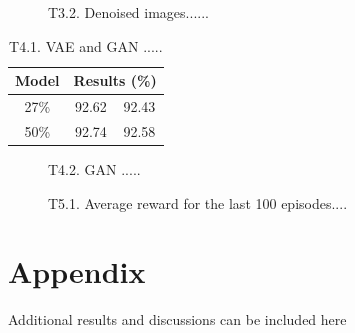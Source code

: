 \documentclass[10pt,twocolumn,letterpaper]{article}
\begin{document}
\begin{figure}[h]
\begin{center}
\fbox{\rule{0pt}{1.2in} \rule{0.99\linewidth}{0pt}}
\end{center}
   \caption{T3.2. Denoised images......}
\label{fig:8}
\end{figure} 

\begin{table}[h]
\small
    \centering
    \begin{tabular}{c|c|c}
        Model & \multicolumn{2}{c}{ Results (\%)} \\
        \hline
        27\% & 92.62 & 92.43 \\ %
        50\% & 92.74 & 92.58 \\ %
    \end{tabular}%
    \medbreak
    \caption{T4.1. VAE and GAN ..... }
    \label{table:3}
\end{table}



\begin{figure}[t]
\begin{center}
\fbox{\rule{0pt}{1.2in} \rule{0.99\linewidth}{0pt}}
\end{center}
   \caption{T4.2. GAN .....}
\label{fig:9}
\end{figure}




\begin{figure}[h]
\begin{center}
\fbox{\rule{0pt}{1.2in} \rule{0.99\linewidth}{0pt}}
\end{center}
   \caption{T5.1. Average reward for the last 100 episodes....}
\label{fig:10}
\end{figure} 



\clearpage

{\small


}

\section{Appendix}
Additional results and discussions can be included here
\end{document}
